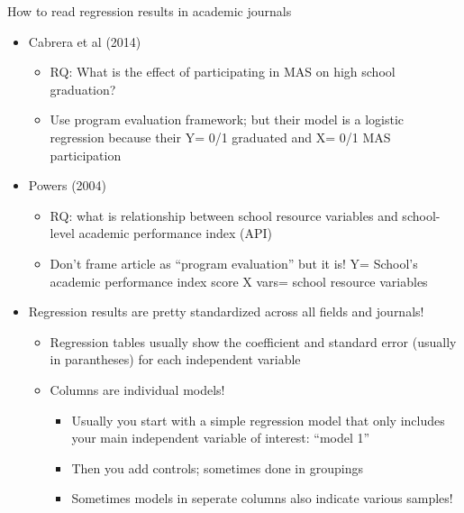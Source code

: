 \documentclass[8pt,ignorenonframetext,dvipsnames]{beamer}
\providecommand{\tightlist}{%
  \setlength{\itemsep}{0pt}\setlength{\parskip}{0pt}}
\let\olditem\item
\renewcommand{\item}{%
  \olditem\vspace{4pt}
}
\begin{document}
\begin{frame}{How to read regression results in academic journals}
\protect\hypertarget{how-to-read-regression-results-in-academic-journals}{}

\begin{itemize}
\tightlist
\item
  Cabrera et al (2014)

  \begin{itemize}
  \tightlist
  \item
    RQ: What is the effect of participating in MAS on high school
    graduation?
  \item
    Use program evaluation framework; but their model is a logistic
    regression because their Y= 0/1 graduated and X= 0/1 MAS
    participation
  \end{itemize}
\item
  Powers (2004)

  \begin{itemize}
  \tightlist
  \item
    RQ: what is relationship between school resource variables and
    school-level academic performance index (API)
  \item
    Don't frame article as ``program evaluation'' but it is! Y= School's
    academic performance index score X vars= school resource variables
  \end{itemize}
\item
  Regression results are pretty standardized across all fields and
  journals!

  \begin{itemize}
  \tightlist
  \item
    Regression tables usually show the coefficient and standard error
    (usually in parantheses) for each independent variable
  \item
    Columns are individual models!

    \begin{itemize}
    \tightlist
    \item
      Usually you start with a simple regression model that only
      includes your main independent variable of interest: ``model 1''
    \item
      Then you add controls; sometimes done in groupings
    \item
      Sometimes models in seperate columns also indicate various
      samples!
    \end{itemize}
  \end{itemize}
\end{itemize}

\end{frame}
\end{document}

